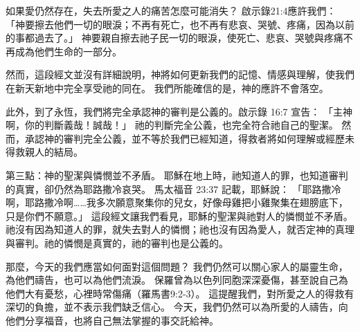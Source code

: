 如果愛仍然存在，失去所愛之人的痛苦怎麼可能消失？
啟示錄21:4應許我們：
「神要擦去他們一切的眼淚；不再有死亡，也不再有悲哀、哭號、疼痛，因為以前的事都過去了。」
神要親自擦去祂子民一切的眼淚，使死亡、悲哀、哭號與疼痛不再成為他們生命的一部分。

然而，這段經文並沒有詳細說明，神將如何更新我們的記憶、情感與理解，使我們在新天新地中完全享受祂的同在。
我們所能確信的是，神的應許不會落空。

此外，到了永恆，我們將完全承認神的審判是公義的。啟示錄 16:7 宣告：
「主神啊，你的判斷義哉！誠哉！」
祂的判斷完全公義，也完全符合祂自己的聖潔。
然而，承認神的審判完全公義，並不等於我們已經知道，得救者將如何理解或經歷未得救親人的結局。

第三點：神的聖潔與憐憫並不矛盾。
耶穌在地上時，祂知道人的罪，也知道審判的真實，卻仍然為耶路撒冷哀哭。
馬太福音 23:37 記載，耶穌說：
「耶路撒冷啊，耶路撒冷啊……我多次願意聚集你的兒女，好像母雞把小雞聚集在翅膀底下，只是你們不願意。」
這段經文讓我們看見，耶穌的聖潔與祂對人的憐憫並不矛盾。
祂沒有因為知道人的罪，就失去對人的憐憫；祂也沒有因為愛人，就否定神的真理與審判。祂的憐憫是真實的，祂的審判也是公義的。

那麼，今天的我們應當如何面對這個問題？
我們仍然可以關心家人的屬靈生命，為他們禱告，也可以為他們流淚。
保羅曾為以色列同胞深深憂傷，甚至說自己為他們大有憂愁，心裡時常傷痛（羅馬書9:2-3）。
這提醒我們，對所愛之人的得救有深切的負擔，並不表示我們缺乏信心。
今天，我們仍然可以為所愛的人禱告，向他們分享福音，也將自己無法掌握的事交託給神。
